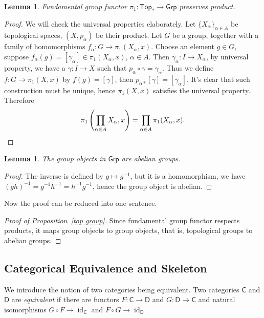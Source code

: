 \documentclass[a4paper]{amsart}
\theoremstyle{plain}
\newtheorem{lem}[thm]{Lemma}
\theoremstyle{definition}
\theoremstyle{remark}
\begin{document}
\begin{lem}
    Fundamental group functor $\pi_1:\mathsf{Top}_*\to\mathsf{Grp}$ preserves product.
\end{lem}
\begin{proof}
    We will check the universal properties elaborately.
    Let $\{X_\alpha\}_{\alpha\in A}$ be topological spaces, $(X,p_\alpha)$ be their product.
    Let $G$ be a group, together with a family of homomorphisms $f_\alpha:G\to\pi_1(X_\alpha,x)$.
    Choose an element $g\in G$, suppose $f_\alpha(g)=[\gamma_\alpha]\in\pi_1(X_\alpha,x)$, $\alpha\in A$.
    Then $\gamma_\alpha:I\to X_\alpha$, by universal property, we have a $\gamma:I\to X$ such that $p_\alpha\circ\gamma=\gamma_\alpha$.
    Thus we define $f:G\to\pi_1(X,x)$ by $f(g)=[\gamma]$, then $p_{\alpha*}[\gamma]=[\gamma_\alpha]$.
    It's clear that such construction must be unique, hence $\pi_1(X,x)$ satisfies the universal property.
    Therefore
    \[\pi_1\left(\prod_{\alpha\in A}X_\alpha,x\right)=\prod_{\alpha\in A}\pi_1(X_\alpha,x).\qedhere\]
\end{proof}

\begin{lem}
    The group objects in $\mathsf{Grp}$ are abelian groups.
\end{lem}
\begin{proof}
    The inverse is defined by $g\mapsto g^{-1}$, but it is a homomorphism, we have $(gh)^{-1}=g^{-1}h^{-1}=h^{-1}g^{-1}$, hence the group object is abelian.
\end{proof}

Now the proof can be reduced into one sentence.
\begin{proof}[Proof of Proposition~\ref{top group}]
    Since fundamental group functor respects products, it maps group objects to group objects, that is, topological groups to abelian groups.
\end{proof}

\subsection{Categorical Equivalence and Skeleton}

We introduce the notion of two categories being equivalent.
Two categories $\mathsf{C}$ and $\mathsf{D}$ are \emph{equivalent} if there are functors $F:\mathsf{C}\to\mathsf{D}$ and $G:\mathsf{D}\to\mathsf{C}$ and natural isomorphisms $G\circ F\to\operatorname{id}_\mathsf{C}$ and $F\circ G\to\operatorname{id}_\mathsf{D}$.
\end{document}
